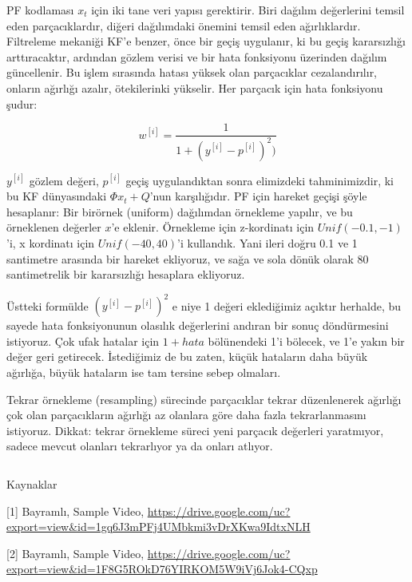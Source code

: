 \documentclass[12pt,fleqn]{article}\usepackage{../../common}
\begin{document}
PF kodlaması $x_t$ için iki tane veri yapısı gerektirir. Biri dağılım
değerlerini temsil eden parçacıklardır, diğeri dağılımdaki önemini temsil eden
ağırlıklardır.  Filtreleme mekaniği KF'e benzer, önce bir geçiş uygulanır, ki bu
geçiş kararsızlığı arttıracaktır, ardından gözlem verisi ve bir hata fonksiyonu
üzerinden dağılım güncellenir. Bu işlem sırasında hatası yüksek olan parçacıklar
cezalandırılır, onların ağırlığı azalır, ötekilerinki yükselir. Her parçacık
için hata fonksiyonu şudur:

$$
w^{[i]} = \frac{1}{1 + (y^{[i]} - p^{[i]})^2  )}
$$

$y^{[i]}$ gözlem değeri, $p^{[i]}$ geçiş uygulandıktan sonra elimizdeki
tahminimizdir, ki bu KF dünyasındaki $\Phi x_t + Q$'nun karşılığıdır. PF için
hareket geçişi şöyle hesaplanır: Bir birörnek (uniform) dağılımdan örnekleme
yapılır, ve bu örneklenen değerler $x$'e eklenir. Örnekleme için z-kordinatı
için $Unif (-0.1, -1)$'i, x kordinatı için $Unif (-40, 40)$'i kullandık. Yani
ileri doğru 0.1 ve 1 santimetre arasında bir hareket ekliyoruz, ve sağa ve sola
dönük olarak 80 santimetrelik bir kararsızlığı hesaplara ekliyoruz.

Üstteki formülde $(y^{[i]} - p^{[i]})^2$ e niye 1 değeri eklediğimiz açıktır
herhalde, bu sayede hata fonksiyonunun olasılık değerlerini andıran bir sonuç
döndürmesini istiyoruz. Çok ufak hatalar için $1 + hata$ bölünendeki 1'i
bölecek, ve 1'e yakın bir değer geri getirecek. İstediğimiz de bu zaten, küçük
hataların daha büyük ağırlığa, büyük hataların ise tam tersine sebep olmaları.

Tekrar örnekleme (resampling) sürecinde parçacıklar tekrar düzenlenerek ağırlığı
çok olan parçacıkların ağırlığı az olanlara göre daha fazla tekrarlanmasını
istiyoruz. Dikkat: tekrar örnekleme süreci yeni parçacık değerleri yaratmıyor,
sadece mevcut olanları tekrarlıyor ya da onları atlıyor.

\inputminted[fontsize=\footnotesize]{python}{track-chess-pf.py}

Kaynaklar

[1] Bayramlı, Sample Video, \url{https://drive.google.com/uc?export=view&id=1gq6J3mPFj4UMbkmi3vDrXKwa9IdtxNLH}

[2] Bayramlı, Sample Video, \url{https://drive.google.com/uc?export=view&id=1F8G5ROkD76YIRKOM5W9iVj6Jok4-CQxp}
\end{document}
